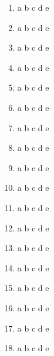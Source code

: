 \documentclass[8pt]{article}
\begin{document}
\begin{multicols*}{2}
\begin{enumerate}
\item \large \textcircled{\small{a}} \textcircled{\small{b}} \textcircled{\small{c}} \textcircled{\small{d}} \textcircled{\small{e}}
\item \large \textcircled{\small{a}} \textcircled{\small{b}} \textcircled{\small{c}} \textcircled{\small{d}} \textcircled{\small{e}}
\item \large \textcircled{\small{a}} \textcircled{\small{b}} \textcircled{\small{c}} \textcircled{\small{d}} \textcircled{\small{e}}
\item \large \textcircled{\small{a}} \textcircled{\small{b}} \textcircled{\small{c}} \textcircled{\small{d}} \textcircled{\small{e}}
\item \large \textcircled{\small{a}} \textcircled{\small{b}} \textcircled{\small{c}} \textcircled{\small{d}} \textcircled{\small{e}}
\item \large \textcircled{\small{a}} \textcircled{\small{b}} \textcircled{\small{c}} \textcircled{\small{d}} \textcircled{\small{e}}
\item \large \textcircled{\small{a}} \textcircled{\small{b}} \textcircled{\small{c}} \textcircled{\small{d}} \textcircled{\small{e}}
\item \large \textcircled{\small{a}} \textcircled{\small{b}} \textcircled{\small{c}} \textcircled{\small{d}} \textcircled{\small{e}}
\item \large \textcircled{\small{a}} \textcircled{\small{b}} \textcircled{\small{c}} \textcircled{\small{d}} \textcircled{\small{e}}
\item \large \textcircled{\small{a}} \textcircled{\small{b}} \textcircled{\small{c}} \textcircled{\small{d}} \textcircled{\small{e}}
\item \large \textcircled{\small{a}} \textcircled{\small{b}} \textcircled{\small{c}} \textcircled{\small{d}} \textcircled{\small{e}}
\item \large \textcircled{\small{a}} \textcircled{\small{b}} \textcircled{\small{c}} \textcircled{\small{d}} \textcircled{\small{e}}
\item \large \textcircled{\small{a}} \textcircled{\small{b}} \textcircled{\small{c}} \textcircled{\small{d}} \textcircled{\small{e}}
\item \large \textcircled{\small{a}} \textcircled{\small{b}} \textcircled{\small{c}} \textcircled{\small{d}} \textcircled{\small{e}}
\item \large \textcircled{\small{a}} \textcircled{\small{b}} \textcircled{\small{c}} \textcircled{\small{d}} \textcircled{\small{e}}
\item \large \textcircled{\small{a}} \textcircled{\small{b}} \textcircled{\small{c}} \textcircled{\small{d}} \textcircled{\small{e}}
\item \large \textcircled{\small{a}} \textcircled{\small{b}} \textcircled{\small{c}} \textcircled{\small{d}} \textcircled{\small{e}}
\item \large \textcircled{\small{a}} \textcircled{\small{b}} \textcircled{\small{c}} \textcircled{\small{d}} \textcircled{\small{e}}
\end{enumerate}
\end{multicols*}
\end{document}
